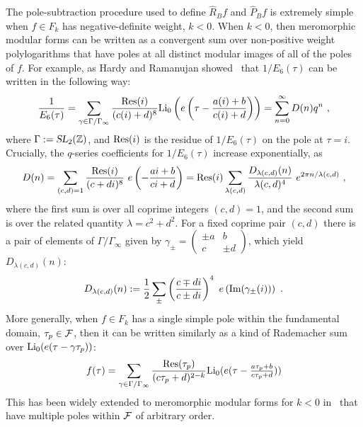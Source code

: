 \documentclass[11pt,a4paper]{article}
\newcommand{\g}{\gamma}
\newcommand{\G}{\Gamma}
\newcommand{\BSM}{\left(\begin{smallmatrix}}
\newcommand{\ESM}{\end{smallmatrix}\right)}
\def\Z{\mathbb{Z}}
\newcommand{\SL}{\operatorname{\textsl{SL}}}	 	%
\newcommand{\PF}{\widehat{P}} 				%
\newcommand{\RF}{\widehat{R}} 				%
\begin{document}
The pole-subtraction procedure used to define $\RF_B f$ and $\PF_B f$ is extremely simple when $f \in F_k$ has negative-definite weight, $k < 0$. When $k < 0$, then meromorphic modular forms can be written as a convergent sum over non-positive weight polylogarithms that have poles at all distinct modular images of all of the poles of $f$. For example, as Hardy and Ramanujan showed~\cite{15-HR1919} that $1/E_6(\tau)$ can be written in the following way:
\begin{align}
\frac{1}{E_6(\tau)} 
= \sum_{\g \in \G/\G_{\infty}} \frac{{\rm Res}(i)}{(c (i) + d)^{8}} {\rm Li}_0\left(e\left(\tau-\frac{a (i) + b}{c (i) + d}\right)\right) 
= \sum_{n = 0}^{\infty} D(n) q^n~,
\label{eqRad1}
\end{align}
where $\G := \SL_2(\Z)$, and ${\rm Res}(i)$ is the residue of $1/E_6(\tau)$ on the pole at $\tau = i$. Crucially, the $q$-series coefficients for $1/E_6(\tau)$ increase exponentially, as
\begin{align}
D(n) 
= \sum_{(c,d)=1} \frac{{\rm Res}(i)}{(c+di)^8} ~ e\left(-\frac{a i + b}{c i + d} \right) 
= {\rm Res}(i) \sum_{\lambda(c,d)} \frac{D_{\lambda(c,d)}(n)}{\lambda(c,d)^4} ~ e^{2 \pi n/\lambda(c,d)}~,
\label{eqRad2}
\end{align}
where the first sum is over all coprime integers $(c,d) = 1$, and the second sum is over the related quantity $\lambda = c^2 + d^2$. For a fixed coprime pair $(c,d)$ there is a pair of elements of $\G/\G_{\infty}$ given by $\g_{\pm} = \BSM \pm a & b \\ c & \pm d \ESM$, which yield $D_{\lambda(c,d)}(n)$:
\begin{align}
D_{\lambda(c,d)}(n) := \frac{1}{2} \sum_{\pm} \left(\frac{c \mp d i}{c \pm d i}\right)^4~e\left( {\rm Im}(\g_{\pm}(i)) \right) ~.
\label{eqRad3}
\end{align}
More generally, when $f \in F_k$ has a single simple pole within the fundamental domain, $\tau_p \in {\cal F}$, then it can be written similarly as a kind of Rademacher sum over ${\rm Li}_0(e(\tau - \g \tau_p))$:
\begin{align}
f(\tau) = \sum_{\g \in \G/\G_{\infty}} \frac{{\rm Res}(\tau_p)}{(c \tau_p + d)^{2-k}} {\rm Li}_0(e(\tau-\tfrac{a \tau_p + b}{c \tau_p + d}))
\label{eqRad4}
\end{align}
This has been widely extended to meromorphic modular forms for $k < 0$ in~\cite{16-BialekPol1, 17-BialekPol2, 18-BialekPol3, 19-KolnPol1, 20-KolnPol2} that have multiple poles within ${\cal F}$ of arbitrary order. 
\end{document}
